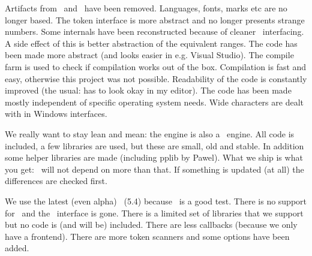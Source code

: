 \stopitemize

\stoptitle

\starttitle[title=The code]

\startitemize

\startitem
    Artifacts from \PASCAL\ and \CWEB\ have been removed.
\stopitem
\startitem
    Languages, fonts, marks etc are no longer  based.
\stopitem
\startitem
    The token interface is more abstract and no longer presents strange numbers.
\stopitem
\startitem
    Some internals have been reconstructed because of cleaner \LUA\ interfacing.
\stopitem
\startitem
    A side effect of this is better abstraction of the equivalent ranges.
\stopitem
\startitem
    The code has been made more abstract (and looks easier in e.g. Visual Studio).
\stopitem
\startitem
    The compile farm is used to check if compilation works out of the box.
\stopitem
\startitem
    Compilation is fast and easy, otherwise this project was not possible.
\stopitem
\startitem
    Readability of the code is constantly improved (the usual: has to look okay
    in my editor).
\stopitem
\startitem
    The code has been made mostly independent of specific operating system needs.
\stopitem
\startitem
    Wide characters are dealt with in Windows interfaces.
\stopitem

\stopitemize

\stoptitle

\starttitle[title=Libraries]

\startitemize

\startitem
    We really want to stay lean and mean: the engine is also a \LUA\ engine.
\stopitem
\startitem
    All code is included, a few libraries are used, but these are small, old and
    stable.
\stopitem
\startitem
    In addition some helper libraries are made (including pplib by Pawel).
\stopitem
\startitem
    What we ship is what you get: \CONTEXT\ will not depend on more than that.
\stopitem
\startitem
    If something is updated (at all) the differences are checked first.
\stopitem

\stopitemize

\stoptitle

\starttitle[title=The \LUA\ engine]

\startitemize

\startitem
    We use the latest (even alpha) \LUA\ (5.4) because \LUAMETATEX\ is a good
    test.
\stopitem
\startitem
    There is no support for \LUAJIT\ and the \FFI\ interface is gone.
\stopitem
\startitem
    There is a limited set of libraries that we support but no code is (and will
    be) included.
\stopitem
\startitem
    There are less callbacks (because we only have a frontend).
\stopitem
\startitem
    There are more token scanners and some options have been added.
\stopitem

